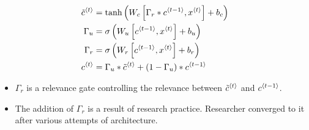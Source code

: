 \begin{itemize}
\begin{center}
  \end{center}
  \begin{align*}
    \tilde{c}^{\left\langle t\right\rangle}&=\tanh\left(W_c\left[\Gamma_r\ast c^{\left\langle t-1\right\rangle},x^{\left\langle t\right\rangle}\right]+b_c\right)\\
    \Gamma_u&=\sigma\left(W_u\left[c^{\left\langle t-1\right\rangle},x^{\left\langle t\right\rangle}\right]+b_u\right)\\
    \Gamma_r&=\sigma\left(W_r\left[c^{\left\langle t-1\right\rangle},x^{\left\langle t\right\rangle}\right]+b_r\right)\\
    c^{\left\langle t\right\rangle}&=\Gamma_u\ast \tilde{c}^{\left\langle t\right\rangle}+\left(1-\Gamma_u\right)\ast c^{\left\langle t-1\right\rangle}
  \end{align*}
  \begin{itemize}
    \item $\Gamma_r$ is a relevance gate controlling the relevance between $\tilde{c}^{\left\langle t\right\rangle}$ and $c^{\left\langle t-1\right\rangle}$.
    \item The addition of $\Gamma_r$ is a result of research practice. Researcher converged to it after various attempts of architecture. 
  \end{itemize}
\end{itemize}
